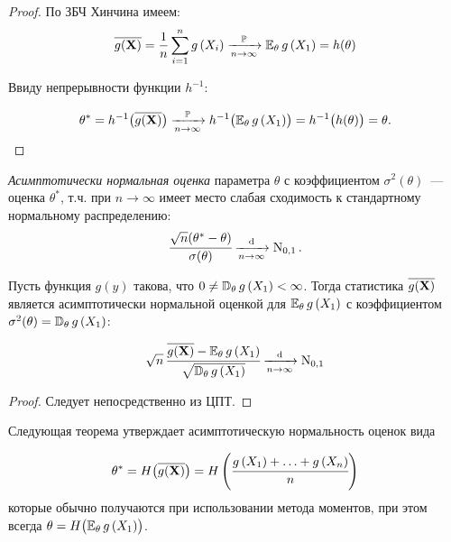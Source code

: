 \begin{proof}
    По ЗБЧ Хинчина имеем:
    \begin{equation*}
        \overline{g(\mathbf{X})} = 
        \frac{1}{n} \sum\limits_{i=1}^{n} g\left(X_{i}\right) 
        \xrightarrow[n \to \infty]{\operatorname{\mathbb{P}}} \operatorname{\operatorname{\mathbb{E}}_{\theta}} g\left(X_{1}\right) = 
        h(\theta)
    \end{equation*}

    Ввиду непрерывности функции $h^{-1}$:

    \begin{equation*}
        \theta^{*} = h^{-1}\bigl(\overline{g(\mathbf{X})}\bigr) 
        \xrightarrow[n \to \infty]{\operatorname{\mathbb{P}}} h^{-1}\bigl(\operatorname{\operatorname{\mathbb{E}}_{\theta}} g\left(X_{1}\right)\bigr) = 
        h^{-1}\bigl(h(\theta)\bigr) = \theta.
    \end{equation*}
\end{proof}

\begin{defn}
    \textit{Асимптотически нормальная оценка} параметра $\theta$ с коэффициентом $\sigma^{2}(\theta)$~--- оценка $\theta^{*}$, т.ч. при $n \to \infty$ имеет место слабая сходимость к стандартному нормальному распределению: 
    \begin{equation*}
        \cfrac{\sqrt{n}(\theta^{*}-\theta)}{\sigma(\theta)} \xrightarrow[n \to \infty]{\text{d}} \operatorname{\mathrm{N}}_{0, 1}.
    \end{equation*}
\end{defn}

\begin{lem}
    Пусть функция $g(y)$ такова, что $0 \neq \operatorname{\mathbb{D}_{\theta}} g\left(X_{1}\right)<\infty$. 
    Тогда статистика $\overline{g(\mathbf{X})}$ является асимптотически нормальной оценкой для $\operatorname{\operatorname{\mathbb{E}}_{\theta}} g\left(X_{1}\right)$ с коэффициентом $\sigma^{2}(\theta)=\operatorname{\mathbb{D}_{\theta}} g\left(X_{1}\right)$:

    \begin{equation*}
        \sqrt{n} \, \cfrac{\overline{g(\mathbf{X})}-\operatorname{\operatorname{\mathbb{E}}_{\theta}} g\left(X_{1}\right)}{\sqrt{\operatorname{\mathbb{D}_{\theta}} g\left(X_{1}\right)}} 
        \xrightarrow[n \to \infty]{\text{d}} \operatorname{\mathrm{N}}_{0, 1}
    \end{equation*}
\end{lem}

\begin{proof}
    Следует непосредственно из ЦПТ.
\end{proof}

\begin{rmrk}
    Следующая теорема утверждает асимптотическую нормальность оценок вида

    \begin{equation*}
        \theta^{*} = 
        H \bigl( \overline{g(\mathbf{X})} \bigr) = 
        H\left(\cfrac{g\left(X_{1}\right)+\ldots+g\left(X_{n}\right)}{n}\right)
    \end{equation*}
    которые обычно получаются при использовании метода моментов, при этом всегда $\theta = H \bigl(\operatorname{\operatorname{\mathbb{E}}_{\theta}} g\left(X_{1}\right) \bigr)$.
\end{rmrk}

